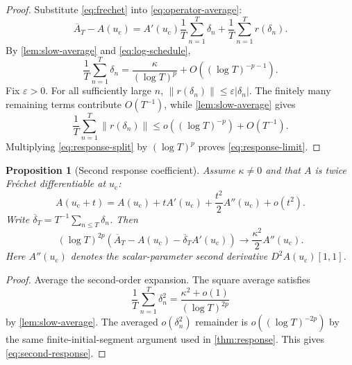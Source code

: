 \documentclass[11pt]{article}
\newtheorem{proposition}[theorem]{Proposition}
\theoremstyle{definition}
\theoremstyle{remark}
\newcommand{\uc}{u_{\mathrm c}}
\begin{document}
\begin{proof}
Substitute \eqref{eq:frechet} into \eqref{eq:operator-average}:
\begin{equation}\label{eq:response-split}
    \overline A_T-A(\uc)
    =A'(\uc)\frac1T\sum_{n=1}^T\delta_n
     +\frac1T\sum_{n=1}^T r(\delta_n).
\end{equation}
By \cref{lem:slow-average} and \eqref{eq:log-schedule},
\begin{equation}\label{eq:delta-average}
    \frac1T\sum_{n=1}^T\delta_n
    =\frac{\kappa}{(\log T)^p}
     +O((\log T)^{-p-1}).
\end{equation}
Fix $\varepsilon>0$.  For all sufficiently large $n$, $\|r(\delta_n)\|\le\varepsilon|\delta_n|$.  The finitely many remaining terms contribute $O(T^{-1})$, while \cref{lem:slow-average} gives
\[
    \frac1T\sum_{n=1}^T\|r(\delta_n)\|
    \le o((\log T)^{-p})+O(T^{-1}).
\]
Multiplying \eqref{eq:response-split} by $(\log T)^p$ proves \eqref{eq:response-limit}.
\end{proof}

\begin{proposition}[Second response coefficient]\label{prop:second-response}
Assume $\kappa\ne0$ and that $A$ is twice Fr\'{e}chet differentiable at $\uc$:
\[
    A(\uc+t)=A(\uc)+tA'(\uc)
      +\frac{t^2}{2}A''(\uc)+o(t^2).
\]
Write $\overline\delta_T=T^{-1}\sum_{n\le T}\delta_n$.  Then
\begin{equation}\label{eq:second-response}
    (\log T)^{2p}
    \left(\overline A_T-A(\uc)-\overline\delta_TA'(\uc)\right)
    \longrightarrow \frac{\kappa^2}{2}A''(\uc).
\end{equation}
Here $A''(\uc)$ denotes the scalar-parameter second derivative $D^2A(\uc)[1,1]$.
\end{proposition}

\begin{proof}
Average the second-order expansion.  The square average satisfies
\[
    \frac1T\sum_{n=1}^T\delta_n^2
    =\frac{\kappa^2+o(1)}{(\log T)^{2p}}
\]
by \cref{lem:slow-average}.  The averaged $o(\delta_n^2)$ remainder is $o((\log T)^{-2p})$ by the same finite-initial-segment argument used in \cref{thm:response}.  This gives \eqref{eq:second-response}.
\end{proof}
\end{document}
